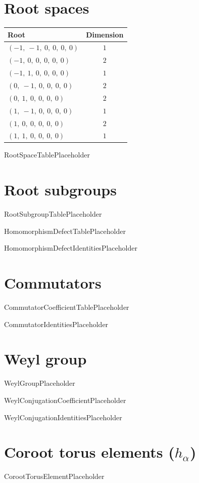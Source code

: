 \documentclass[11pt]{article}
\theoremstyle{definition}
\begin{document}
\section{Root spaces}

\begin{center}
\begin{tabular}{|l|c|}
\hline
Root & Dimension \\
\hline
$\left( -1, \  -1, \  0, \  0, \  0, \  0\right)$ & $1$ \\
\hline
$\left( -1, \  0, \  0, \  0, \  0, \  0\right)$ & $2$ \\
\hline
$\left( -1, \  1, \  0, \  0, \  0, \  0\right)$ & $1$ \\
\hline
$\left( 0, \  -1, \  0, \  0, \  0, \  0\right)$ & $2$ \\
\hline
$\left( 0, \  1, \  0, \  0, \  0, \  0\right)$ & $2$ \\
\hline
$\left( 1, \  -1, \  0, \  0, \  0, \  0\right)$ & $1$ \\
\hline
$\left( 1, \  0, \  0, \  0, \  0, \  0\right)$ & $2$ \\
\hline
$\left( 1, \  1, \  0, \  0, \  0, \  0\right)$ & $1$ \\
\hline
\end{tabular}\end{center}

RootSpaceTablePlaceholder

\section{Root subgroups}

RootSubgroupTablePlaceholder

HomomorphismDefectTablePlaceholder

HomomorphismDefectIdentitiesPlaceholder

\section{Commutators}

CommutatorCoefficientTablePlaceholder

CommutatorIdentitiesPlaceholder

\section{Weyl group}

WeylGroupPlaceholder

WeylConjugationCoefficientPlaceholder

WeylConjugationIdentitiesPlaceholder

\section{Coroot torus elements ($h_\alpha$)}

CorootTorusElementPlaceholder
\end{document}
